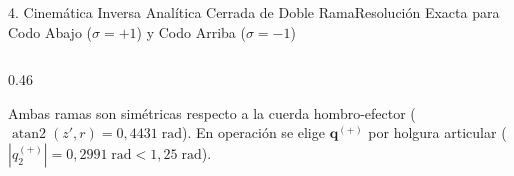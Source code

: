 \documentclass[aspectratio=169,10pt,xcolor=table]{beamer}
\newcommand{\abs}[1]{\left\lvert#1\right\rvert}
\begin{document}
\begin{frame}{4. Cinemática Inversa Analítica Cerrada de Doble Rama}{Resolución Exacta para Codo Abajo ($\sigma=+1$) y Codo Arriba ($\sigma=-1$)}
\begin{columns}[T,totalwidth=\textwidth]
\begin{column}{0.46\textwidth}
    \vspace{0.7mm}
    \begin{cajaadv}
      \fontsize{6.4}{7.8}\selectfont
      Ambas ramas son simétricas respecto a la cuerda hombro-efector ($\operatorname{atan2}(z',r)=0{,}4431\;\text{rad}$). En operación se elige $\bm{q}^{(+)}$ por holgura articular ($\abs{q_2^{(+)}}=0{,}2991\;\text{rad}<1{,}25\;\text{rad}$).
    \end{cajaadv}
  \end{column}
\end{columns}
\end{frame}

\end{document}
